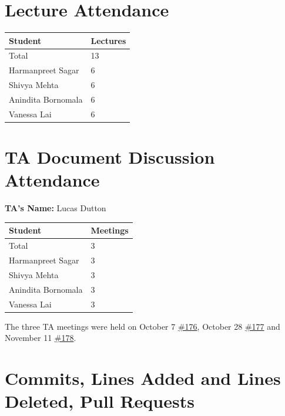 \documentclass{article}
\begin{document}
\section{Lecture Attendance}

\begin{table}[H]
\centering
\begin{tabular}{ll}
\toprule
\textbf{Student} & \textbf{Lectures}\\
\midrule
Total & 13\\
Harmanpreet Sagar & 6\\
Shivya Mehta & 6\\
Anindita Bornomala & 6\\
Vanessa Lai & 6\\
\bottomrule
\end{tabular}
\end{table}

\section{TA Document Discussion Attendance}

\noindent \textbf{TA's Name: } Lucas Dutton

\begin{table}[H]
\centering
\begin{tabular}{ll}
\toprule
\textbf{Student} & \textbf{Meetings}\\
\midrule
Total & 3\\
Harmanpreet Sagar & 3\\
Shivya Mehta & 3\\
Anindita Bornomala & 3\\
Vanessa Lai & 3\\
\bottomrule
\end{tabular}
\end{table}

The three TA meetings were held on October 7 \href{https://github.com/shivyam/cas-course-optimization/issues/176}{\#176}, October 28 \href{https://github.com/shivyam/cas-course-optimization/issues/177}{\#177} and November 11 \href{https://github.com/shivyam/cas-course-optimization/issues/178}{\#178}.

\section{Commits, Lines Added and Lines Deleted, Pull Requests}
\end{document}

